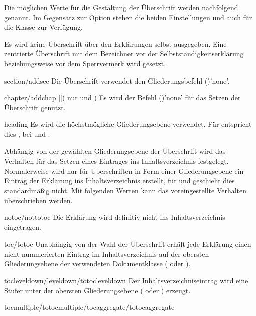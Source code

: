 \begin{Declaration*}{}
\begin{Declaration*}{}
\begin{Declaration*}{}
\begin{Declaration}
Die möglichen Werte für die Gestaltung der Überschrift werden nachfolgend 
genannt. Im Gegensatz zur Option  stehen die beiden 
Einstellungen  und  auch für 
die Klasse  zur Verfügung.
%
\begin{values}{}
\itemfalse
  Es wird keine Überschrift über den Erklärungen selbst ausgegeben.
\itemtrue*
  Eine zentrierte Überschrift mit dem Bezeichner  vor 
  der Selbstständigkeitserklärung beziehungsweise  vor dem 
  Sperrvermerk wird gesetzt. 
\item[section/addsec]
  Die Überschrift verwendet den Gliederungsbefehl 
  ()'none'.
\item[chapter/addchap][\Class{tudscrbook}](%
    nur  und %
  )
  Es wird der Befehl ()'none' für das 
  Setzen der Überschrift genutzt. 
\item[heading]
  Es wird die höchstmögliche Gliederungsebene verwendet. Für 
   entspricht dies , bei 
   und  .
\end{values}
%
Abhängig von der gewählten Gliederungsebene der Überschrift wird das Verhalten 
für das Setzen eines Eintrages ins Inhaltsverzeichnis festgelegt. Normalerweise 
wird nur für Überschriften in Form einer Gliederungsebene ein Eintrag der 
Erklärung ins Inhaltsverzeichnis erstellt, für  und 
 geschieht dies standardmäßig nicht. Mit folgenden 
Werten kann das voreingestellte Verhalten überschrieben werden.
%
\begin{values}{}
\item[notoc/nottotoc]
  Die Erklärung wird definitiv nicht ins Inhaltsverzeichnis eingetragen.
\item[toc/totoc]
  Unabhängig von der Wahl der Überschrift erhält jede Erklärung einen nicht
  nummerierten Eintrag im Inhaltsverzeichnis auf der obersten Gliederungsebene 
  der verwendeten Dokumentklasse ( oder ). 
\item[tocleveldown/leveldown/totocleveldown]
  Der Inhaltsverzeichniseintrag wird eine Stufer unter der obersten 
  Gliederungsebene ( oder ) erzeugt.
\item[tocmultiple/totocmultiple/tocaggregate/totocaggregate]

\end{values}
\end{Declaration}
\end{Declaration*}
\end{Declaration*}
\end{Declaration*}
